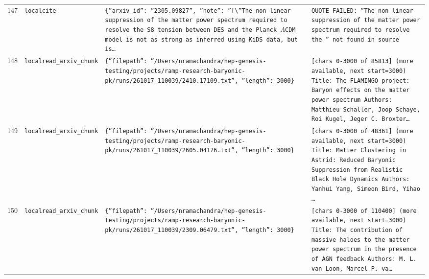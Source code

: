 \documentclass[11pt,a4paper]{article}
\begin{document}
\begin{longtable}{@{}p{}p{}p{}p{}@{}}
147 & \texttt{local}\newline\texttt{cite} & \texttt{\{''arxiv\_\allowbreak{}id'':\allowbreak{} ''2305.09827'',\allowbreak{} ''note'':\allowbreak{} ''[\textbackslash{}\allowbreak{}''The non-linear suppression of the matter power spectrum required to resolve the S8 tension between DES and the Planck $\Lambda$CDM model is not as strong as inferred using KiDS data,\allowbreak{} but is\ldots{}\allowbreak{}} & \texttt{QUOTE FAILED:\allowbreak{} ''The non-linear suppression of the matter power spectrum required to resolve the '' not found in source} \\
148 & \texttt{local}\newline\texttt{read\_\allowbreak{}arxiv\_\allowbreak{}chunk} & \texttt{\{''filepath'':\allowbreak{} ''/\allowbreak{}Users/\allowbreak{}nramachandra/\allowbreak{}hep-genesis-testing/\allowbreak{}projects/\allowbreak{}ramp-research-baryonic-pk/\allowbreak{}runs/\allowbreak{}261017\_\allowbreak{}110039/\allowbreak{}2410.17109.txt'',\allowbreak{} ''length'':\allowbreak{} 3000\}\allowbreak{}} & \texttt{[chars 0-3000 of 85813]\allowbreak{} (more available,\allowbreak{} next start=\allowbreak{}3000)\allowbreak{}  Title:\allowbreak{} The FLAMINGO project:\allowbreak{} Baryon effects on the matter power spectrum Authors:\allowbreak{} Matthieu Schaller,\allowbreak{} Joop Schaye,\allowbreak{} Roi Kugel,\allowbreak{} Jeger C. Broxter\ldots{}\allowbreak{}} \\
149 & \texttt{local}\newline\texttt{read\_\allowbreak{}arxiv\_\allowbreak{}chunk} & \texttt{\{''filepath'':\allowbreak{} ''/\allowbreak{}Users/\allowbreak{}nramachandra/\allowbreak{}hep-genesis-testing/\allowbreak{}projects/\allowbreak{}ramp-research-baryonic-pk/\allowbreak{}runs/\allowbreak{}261017\_\allowbreak{}110039/\allowbreak{}2605.04176.txt'',\allowbreak{} ''length'':\allowbreak{} 3000\}\allowbreak{}} & \texttt{[chars 0-3000 of 48361]\allowbreak{} (more available,\allowbreak{} next start=\allowbreak{}3000)\allowbreak{}  Title:\allowbreak{} Matter Clustering in Astrid:\allowbreak{} Reduced Baryonic Suppression from Realistic Black Hole Dynamics Authors:\allowbreak{} Yanhui Yang,\allowbreak{} Simeon Bird,\allowbreak{} Yihao \ldots{}\allowbreak{}} \\
150 & \texttt{local}\newline\texttt{read\_\allowbreak{}arxiv\_\allowbreak{}chunk} & \texttt{\{''filepath'':\allowbreak{} ''/\allowbreak{}Users/\allowbreak{}nramachandra/\allowbreak{}hep-genesis-testing/\allowbreak{}projects/\allowbreak{}ramp-research-baryonic-pk/\allowbreak{}runs/\allowbreak{}261017\_\allowbreak{}110039/\allowbreak{}2309.06479.txt'',\allowbreak{} ''length'':\allowbreak{} 3000\}\allowbreak{}} & \texttt{[chars 0-3000 of 110400]\allowbreak{} (more available,\allowbreak{} next start=\allowbreak{}3000)\allowbreak{}  Title:\allowbreak{} The contribution of massive haloes to the matter power spectrum in the presence of AGN feedback Authors:\allowbreak{} M. L. van Loon,\allowbreak{} Marcel P. va\ldots{}\allowbreak{}} \\

\end{longtable}
\end{document}
